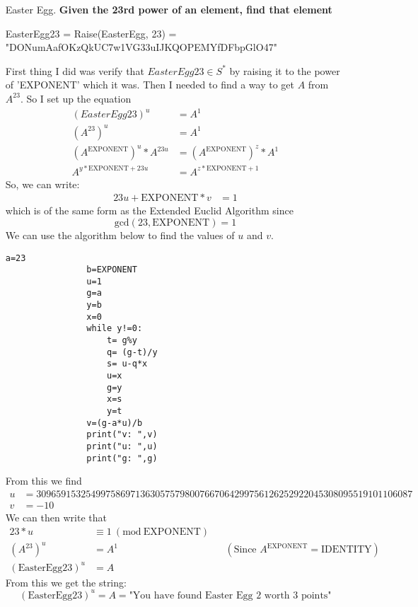 \documentclass[12pt,letterpaper]{article}
\newcommand{\Mod}[1]{\ (\mathrm{mod}\ #1)}
\begin{document}
\begin{itemize}
        \newpage
    \item [Easter Egg.] \textbf{Given the 23rd power of an element, find that element}
        
        EasterEgg23 = Raise(EasterEgg, 23) = \\"DONumAafOKzQkUC7w1VG33uIJKQOPEMYfDFbpGlO47"
        
        First thing I did was verify that $EasterEgg23\in S^*$ by raising it to the power of 'EXPONENT' which it was. Then I needed to find a way to get $A$ from $A^{23}$. So I set up the equation 
        \begin{align*}
            (EasterEgg23)^u&=A^1\\
            (A^{23})^u&=A^1\\
            (A^\text{EXPONENT})^u*A^{23u} &= (A^\text{EXPONENT})^z*A^1\\
            A^{y*\text{EXPONENT}+23u} &= A^{z*\text{EXPONENT} + 1}
        \end{align*}
        So, we can write:
        \begin{align*}
            23u + \text{EXPONENT}*v &= 1
        \end{align*}
        which is of the same form as the Extended Euclid Algorithm \cite{Crypto} since\\ $$\text{gcd}(23,\text{EXPONENT})=1$$
        We can use the algorithm below to find the values of $u$ and $v$. 
            \begin{lstlisting}[style = Python]
                a=23
                b=EXPONENT
                u=1
                g=a
                y=b
                x=0
                while y!=0:
                    t= g%y
                    q= (g-t)/y
                    s= u-q*x
                    u=x
                    g=y
                    x=s
                    y=t
                v=(g-a*u)/b
                print("v: ",v)
                print("u: ",u)
                print("g: ",g)
        \end{lstlisting}
         
        From this we find
        \begin{align*}
            u &= 3096591532549975869713630575798007667064299756126252922045308095519101106087\\
            v &= -10
        \end{align*}
        We can then write that 
        \begin{align*}
            23*u &\equiv 1 \Mod{\text{EXPONENT}}\\
            (A^{23})^u&=A^1 && (\text{Since $A^\text{EXPONENT}=\text{IDENTITY}$})\\
            (\text{EasterEgg23})^u&=A
        \end{align*}
        From this we get the string: $$(\text{EasterEgg23})^u = A = \text{"You have found Easter Egg 2 worth 3 points"}$$
\end{itemize}
\end{document}
